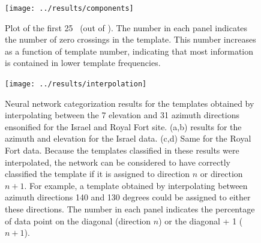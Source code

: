 \documentclass[preprint,5p]{elsarticle}
\begin{document}
\begin{figure}[h]
	\centering
	\texttt{[image: ../results/components]}
	\caption{Plot of the first 25 \pcs\ (out of \pca). The number in each panel indicates the number of zero crossings in the template. This number increases as a function of template number, indicating that most information is contained in lower template frequencies.}
	\label{fig:components}
\end{figure}

\begin{figure}[h]
	\centering
	\texttt{[image: ../results/interpolation]}
	\caption{Neural network categorization results for the templates obtained by interpolating between the 7 elevation and 31 azimuth directions ensonified for the Israel and Royal Fort site. (a,b) results for the azimuth and elevation for the Israel data. (c,d) Same for the Royal Fort data. Because the templates classified in these results were interpolated, the network can be considered to have correctly classified the template if it is assigned to direction $n$ or direction $n+1$. For example, a template obtained by interpolating between azimuth directions 140 and 130 degrees could be assigned to either these directions. The number in each panel indicates the percentage of data point on the diagonal (direction $n$) or the diagonal + 1 ($n+1$).}
	\label{fig:interpolation}
\end{figure}
\end{document}
